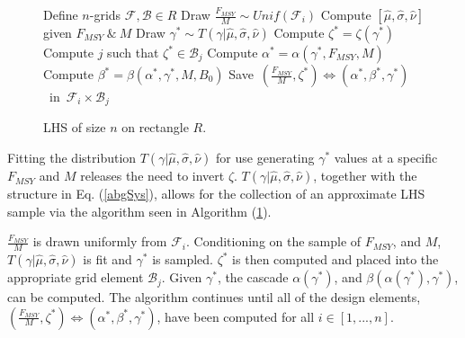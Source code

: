\documentclass[12pt]{article}
\begin{document}

%
\clearpage
%
\begin{figure}
	\vspace{-1cm}
	\begin{minipage}{0.5\textwidth}
      		\begin{algorithm}[H]
			\caption{LHS of size $n$ on rectangle $R$.}
			\label{lhsAlg}
			\begin{algorithmic}[1]
			\State Define $n$-grids $\mathcal{F}, \mathcal{B}\in R$
			\State Draw $\frac{F_{MSY}}{M} \sim Unif(\mathcal{F}_i)$
			\State Compute $[\hat\mu, \hat\sigma, \hat\nu]$ given $F_{MSY}~\&~M$
				\State Draw $\gamma^* \sim T(\gamma|\hat\mu, \hat\sigma, \hat\nu)$
				\State Compute $\zeta^* = \zeta(\gamma^*)$
				\State Compute $j$ such that $\zeta^*\in\mathcal{B}_j$
			\EndWhile
			\State Compute $\alpha^* = \alpha(\gamma^*, F_{MSY}, M)$ 
			\State Compute $\beta^* = \beta(\alpha^*, \gamma^*, M, B_0)$	
			\State \mbox{Save $(\frac{F_{MSY}}{M}, \zeta^*)\Leftrightarrow(\alpha^*, \beta^*, \gamma^*)$ in $\mathcal{F}_i\times\mathcal{B}_j$} 
			\EndFor
			\EndProcedure
			\end{algorithmic}
		\end{algorithm}
	\end{minipage}
\end{figure}

Fitting the distribution $T(\gamma|\hat\mu, \hat\sigma, \hat\nu)$ for 
use generating $\gamma^*$ values at a specific $F_{MSY}$ and $M$ releases the 
need to invert $\zeta$. $T(\gamma|\hat\mu, \hat\sigma, \hat\nu)$, together with 
the structure in Eq. (\ref{abgSys}), allows for the collection of an approximate
LHS sample via the algorithm seen in Algorithm (\ref{lhsAlg}).%

%
$\frac{F_{MSY}}{M}$ is drawn uniformly from $\mathcal{F}_i$. Conditioning on the 
sample of $F_{MSY}$, and $M$, $T(\gamma|\hat\mu, \hat\sigma, \hat\nu)$ is fit and 
$\gamma^*$ is sampled. $\zeta^*$ is then computed and placed into the appropriate
grid element $\mathcal{B}_j$. Given $\gamma^*$, the cascade $\alpha(\gamma^*)$, 
and $\beta(\alpha(\gamma^*), \gamma^*)$, can be computed. The algorithm 
continues until all of the design elements, $(\frac{F_{MSY}}{M}, \zeta^*)\Leftrightarrow(\alpha^*, \beta^*, \gamma^*)$,
have been computed for all $i\in[1,...,n]$.
\end{document}
